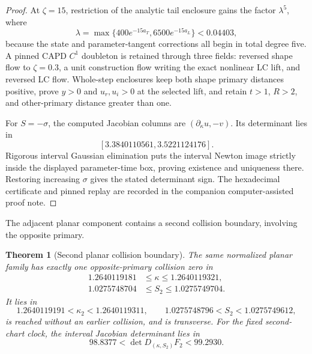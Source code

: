 \documentclass[11pt]{article}
\newtheorem{theorem}{Theorem}
\begin{document}
\begin{proof}
At $\zeta=15$, restriction of the analytic tail enclosure gains the factor
$\lambda^5$, where
\[
 \lambda=\max\{400e^{-15a_T},6500e^{-15a_L}\}<0.04403,
\]
because the state and parameter-tangent corrections all begin in total degree
five. A pinned CAPD $C^1$ doubleton is retained through three fields: reversed
shape flow to $\zeta=0.3$, a unit construction flow writing the exact
nonlinear LC lift, and reversed LC flow. Whole-step enclosures keep both shape
primary distances positive, prove $y>0$ and $u_r,u_i>0$ at the selected lift,
and retain $t>1$, $R>2$, and other-primary distance greater than one.

For $S=-\sigma$, the computed Jacobian columns are
$(\partial_\kappa u,-v)$. Its determinant lies in
\[
 [3.3840110561,3.5221124176].
\]
Rigorous interval Gaussian elimination puts the
interval Newton image strictly inside the displayed parameter-time box,
proving existence and uniqueness there. Restoring increasing $\sigma$ gives
the stated determinant sign. The hexadecimal certificate and pinned replay
are recorded in the companion computer-assisted proof note.
\end{proof}

The adjacent planar component contains a second collision boundary, involving
the opposite primary.

\begin{theorem}[Second planar collision boundary]
The same normalized planar family has exactly one opposite-primary collision
zero in
\[
 \begin{aligned}
 1.2640119181&\le\kappa\le1.2640119321,\\
 1.0275748704&\le S_2\le1.0275749704.
 \end{aligned}
\]
It lies in
\[
 1.2640119191<\kappa_2<1.2640119311,
 \qquad
 1.0275748796<S_2<1.0275749612,
\]
is reached without an earlier collision, and is transverse.  For the fixed
second-chart clock, the interval Jacobian determinant lies in
\[
 98.8377<\det D_{(\kappa,S_2)}F_2<99.2930.
\]
\end{theorem}
\end{document}
